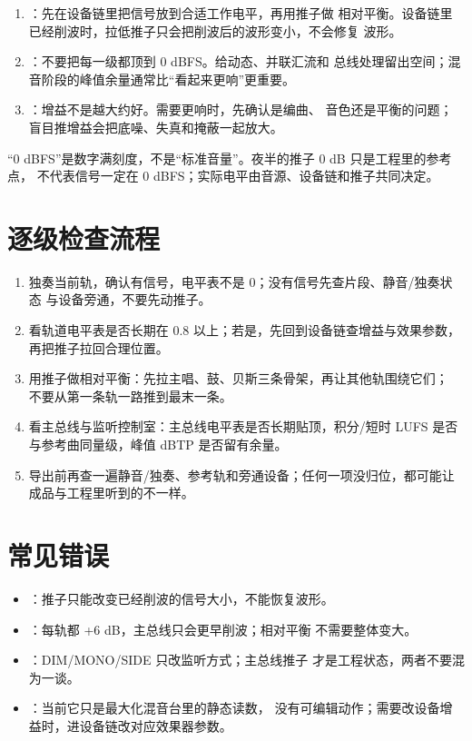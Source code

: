 \begin{enumerate}
  \item {}：先在设备链里把信号放到合适工作电平，再用推子做
        相对平衡。设备链里已经削波时，拉低推子只会把削波后的波形变小，不会修复
        波形。
  \item {}：不要把每一级都顶到 0 dBFS。给动态、并联汇流和
        总线处理留出空间；混音阶段的峰值余量通常比“看起来更响”更重要。
  \item {}：增益不是越大约好。需要更响时，先确认是编曲、
        音色还是平衡的问题；盲目推增益会把底噪、失真和掩蔽一起放大。
\end{enumerate}

“0 dBFS”是数字满刻度，不是“标准音量”。夜半的推子 0 dB 只是工程里的参考点，
不代表信号一定在 0 dBFS；实际电平由音源、设备链和推子共同决定。

\section{逐级检查流程}

\begin{enumerate}
  \item 独奏当前轨，确认有信号，电平表不是 0；没有信号先查片段、静音/独奏状态
        与设备旁通，不要先动推子。
  \item 看轨道电平表是否长期在 0.8 以上；若是，先回到设备链查增益与效果参数，
        再把推子拉回合理位置。
  \item 用推子做相对平衡：先拉主唱、鼓、贝斯三条骨架，再让其他轨围绕它们；
        不要从第一条轨一路推到最末一条。
  \item 看主总线与监听控制室：主总线电平表是否长期贴顶，积分/短时 LUFS 是否
        与参考曲同量级，峰值 dBTP 是否留有余量。
  \item 导出前再查一遍静音/独奏、参考轨和旁通设备；任何一项没归位，都可能让
        成品与工程里听到的不一样。
\end{enumerate}

\section{常见错误}

\begin{itemize}
  \item {}：推子只能改变已经削波的信号大小，不能恢复波形。
  \item {}：每轨都 +6 dB，主总线只会更早削波；相对平衡
        不需要整体变大。
  \item {}：DIM/MONO/SIDE 只改监听方式；主总线推子
        才是工程状态，两者不要混为一谈。
  \item {}：当前它只是最大化混音台里的静态读数，
        没有可编辑动作；需要改设备增益时，进设备链改对应效果器参数。
\end{itemize}


